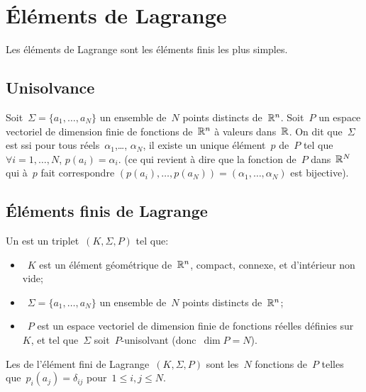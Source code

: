 \medskip
\section{Éléments de Lagrange}

Les éléments de Lagrange sont les éléments finis les plus simples.

\medskip
\subsection{Unisolvance}\label{Sec-unisolvance}

\begin{definition}[Unisolvance]
Soit~$\Sigma=\{a_1,\ldots, a_N\}$ un ensemble de~$N$ points distincts de~$\mathbb R^n$.
Soit~$P$ un espace vectoriel de dimension finie de fonctions de~$\mathbb R^n$ à valeurs dans~$\mathbb R$.
On dit que~$\Sigma$ est  ssi pour tous réels~$\alpha_1$,\ldots, $\alpha_N$,
il existe un unique élément~$p$ de~$P$ tel que~$\forall i=1,\ldots, N$, $p(a_i) = \alpha_i$.
(ce qui revient à dire que la fonction de~$P$ dans~$\mathbb R^N$ qui à~$p$ fait correspondre
$(p(a_i),\ldots, p(a_N))=(\alpha_1,\ldots, \alpha_N)$ est bijective).
\end{definition}

\medskip
\subsection{Éléments finis de Lagrange}

\begin{definition}
Un  est un triplet~$(K, \Sigma, P)$ tel que:
\begin{itemize}
\item~$K$ est un élément géométrique de~$\mathbb R^n$, compact, connexe, et d'intérieur
	non vide;
\item~$\Sigma=\{a_1,\ldots, a_N\}$ un ensemble de~$N$ points distincts de~$\mathbb R^n$;
\item~$P$ est un espace vectoriel de dimension finie de fonctions réelles définies sur~$K$, et tel
	que~$\Sigma$ soit~$P$-unisolvant (donc~$\dim P = N$).
\end{itemize}
\end{definition}
\medskip
Les  de l'élément fini de Lagrange~$(K, \Sigma, P)$
sont les~$N$ fonctions de~$P$ telles que~$p_i(a_j)=\delta_{ij}$ pour~$1\le i,j\le N$.
\medskip
